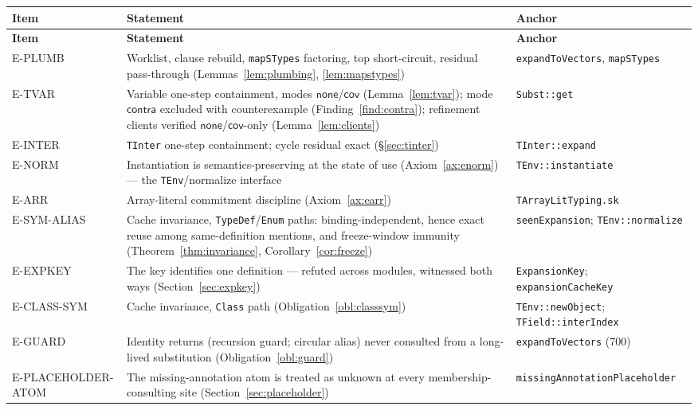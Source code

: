 \documentclass[11pt]{article}
\newcommand{\Cov}{\mathsf{cov}}
\newcommand{\Contra}{\mathsf{contra}}
\newcommand{\NoneM}{\mathsf{none}}
\begin{document}
\begingroup
\renewcommand{\arraystretch}{1.25}
\small
\begin{longtable}{@{}p{2.4cm}p{7.8cm}p{3.3cm}@{}}
\toprule
\textbf{Item} & \textbf{Statement} & \textbf{Anchor} \\
\midrule
\endfirsthead
\toprule
\textbf{Item} & \textbf{Statement} & \textbf{Anchor} \\
\midrule
\endhead
\bottomrule
\endlastfoot
E-PLUMB & Worklist, clause rebuild, \texttt{mapSTypes} factoring, top
  short-circuit, residual pass-through
  (Lemmas~\ref{lem:plumbing}, \ref{lem:mapstypes}) &
  \texttt{expandToVectors}, \texttt{mapSTypes} \\
E-TVAR & Variable one-step containment, modes $\NoneM$/$\Cov$
  (Lemma~\ref{lem:tvar}); mode $\Contra$ excluded with counterexample
  (Finding~\ref{find:contra}); refinement clients verified
  $\NoneM$/$\Cov$-only (Lemma~\ref{lem:clients}) &
  \texttt{Subst::get} \\
E-INTER & \texttt{TInter} one-step containment; cycle residual exact
  (\S\ref{sec:tinter}) & \texttt{TInter::expand} \\
E-NORM & Instantiation is semantics-preserving at the state of use
  (Axiom~\ref{ax:enorm}) — the \texttt{TEnv}/normalize interface &
  \texttt{TEnv::instantiate} \\
E-ARR & Array-literal commitment discipline (Axiom~\ref{ax:earr}) &
  \texttt{TArrayLitTyping.sk} \\
E-SYM-ALIAS & Cache invariance, \texttt{TypeDef}/\texttt{Enum} paths:
  binding-independent, hence exact reuse among same-definition mentions, and
  freeze-window immunity
  (Theorem~\ref{thm:invariance}, Corollary~\ref{cor:freeze}) &
  \texttt{seenExpansion}; \texttt{TEnv::normalize} \\
E-EXPKEY & The key identifies one definition — refuted across modules,
  witnessed both ways (Section~\ref{sec:expkey}) &
  \texttt{ExpansionKey}; \texttt{expansionCacheKey} \\
E-CLASS-SYM & Cache invariance, \texttt{Class} path
  (Obligation~\ref{obl:classsym}) & \texttt{TEnv::newObject};
  \texttt{TField::interIndex} \\
E-GUARD & Identity returns (recursion guard; circular alias) never
  consulted from a long-lived substitution
  (Obligation~\ref{obl:guard}) &
  \texttt{expandToVectors} (700) \\
E-PLACEHOLDER-ATOM & The missing-annotation atom is treated as unknown
  at every membership-consulting site
  (Section~\ref{sec:placeholder}) &
  \texttt{missingAnnotationPlaceholder} \\
\end{longtable}
\endgroup
\end{document}
